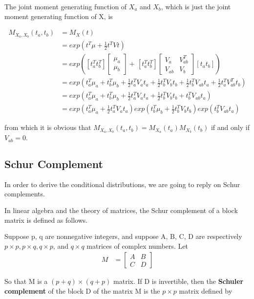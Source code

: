 The joint moment generating function of $X_a$ and $X_b$, which is just the joint moment generating function of X, is

\begin{align*}
	M_{X_a, X_b}(t_a, t_b) &= M_{X}(t) \\
	&= exp(t^T \mu + \frac{1}{2} t^T V t) \\
	&= exp \left( [t_a^T t_b^T] \begin{bmatrix}
		\mu_a \\
		\mu_b
	\end{bmatrix} + \frac{}{} [t_a^T t_b^T] \begin{bmatrix}
	V_a & V_{ab}^T \\
	V_{ab} & V_b
\end{bmatrix} [t_a t_b] \right) \\
&= exp \left( t_a^T \mu_a + t_b^T \mu_b + \frac{1}{2} t_a^T V_a t_a + \frac{1}{2} t_b^T V_b t_b + \frac{1}{2} t_b^T V_{ab} t_a + \frac{1}{2} t_a^T V_{ab}^T t_b \right) \\
&= exp \left( t_a^T \mu_a + t_b^T \mu_b + \frac{1}{2} t_a^T V_a t_a + \frac{1}{2} t_b^T V_b t_b +  t_b^T V_{ab} t_a  \right) \\
&= exp \left( t_a^T \mu_a + \frac{1}{2} t_a^T V_a t_a \right) exp \left( t_b^T \mu_b + \frac{1}{2} t_b^T V_b t_b \right) exp( t_b^T V_{ab} t_a)
\end{align*}

from which it is obvious that $M_{X_a, X_b}(t_a, t_b) = M_{X_a}(t_a) M_{X_b}(t_b)$ if and only if $V_{ab} = 0$.

\subsection{Schur Complement}
In order to derive the conditional distributions, we are going to reply on Schur complements. 

In linear algebra and the theory of matrices, the Schur complement of a block matrix is defined as follows.

Suppose p, q are nonnegative integers, and suppose A, B, C, D are respectively $p \times p, p \times q, q \times p$, and $q \times q$ matrices of complex numbers. Let
\begin{align*}
M &= \begin{bmatrix}
	A & B \\
	C & D
\end{bmatrix}
\end{align*}

So that M is a $(p+q) \times (q + p)$ matrix. If D is invertible, then the \textbf{ Schuler complement
} of the block D of the matrix M is the $p \times p$ matrix defined by 


